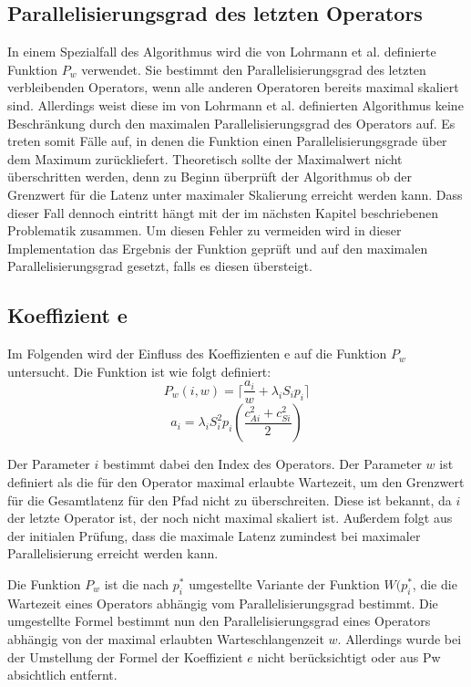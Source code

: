\subsection{Parallelisierungsgrad des letzten Operators}
In einem Spezialfall des Algorithmus wird die von Lohrmann et al. definierte Funktion \(P_w\) verwendet. 
Sie bestimmt den Parallelisierungsgrad des letzten verbleibenden Operators, wenn alle anderen Operatoren bereits maximal skaliert sind.
Allerdings weist diese im von Lohrmann et al. definierten Algorithmus keine Beschränkung durch den maximalen Parallelisierungsgrad des Operators auf. 
Es treten somit Fälle auf, in denen die Funktion einen Parallelisierungsgrade über dem Maximum zurückliefert.
Theoretisch sollte der Maximalwert nicht überschritten werden, denn zu Beginn überprüft der Algorithmus ob der Grenzwert für die Latenz unter maximaler Skalierung erreicht werden kann.
Dass dieser Fall dennoch eintritt hängt mit der im nächsten Kapitel beschriebenen Problematik zusammen.
Um diesen Fehler zu vermeiden wird in dieser Implementation das Ergebnis der Funktion geprüft und auf den maximalen Parallelisierungsgrad gesetzt, falls es diesen übersteigt.

\subsection{Koeffizient e}

Im Folgenden wird der Einfluss des Koeffizienten e auf die Funktion \(P_w\) untersucht.
Die Funktion ist wie folgt definiert:
\[P_w(i, w) = \lceil \frac{a_i}{w} + \lambda_i S_i p_i \rceil \]
\[a_i = \lambda_i S^{2}_{i} p_i \left(\frac{{c^{2}_{Ai}} + {c^{2}_{Si}}}{2}\right)\]

Der Parameter \(i\) bestimmt dabei den Index des Operators. 
Der Parameter \(w\) ist definiert als die für den Operator maximal erlaubte Wartezeit, um den Grenzwert für die Gesamtlatenz für den Pfad nicht zu überschreiten.
Diese ist bekannt, da \(i\) der letzte Operator ist, der noch nicht maximal skaliert ist.
Außerdem folgt aus der initialen Prüfung, dass die maximale Latenz zumindest bei maximaler Parallelisierung erreicht werden kann.

Die Funktion \(P_w\) ist die nach \(p_i^\ast\) umgestellte Variante der Funktion \(W(p_i^\ast\), die die Wartezeit eines Operators abhängig vom Parallelisierungsgrad bestimmt. 
Die umgestellte Formel bestimmt nun den Parallelisierungsgrad eines Operators abhängig von der maximal erlaubten Warteschlangenzeit \(w\). 
Allerdings wurde bei der Umstellung der Formel der Koeffizient \(e\) nicht berücksichtigt oder aus Pw absichtlich entfernt. 

